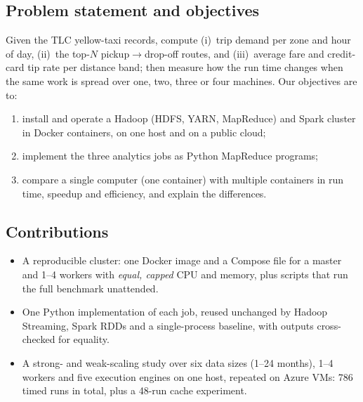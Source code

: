 \subsection{Problem statement and objectives}
Given the TLC yellow-taxi records, compute (i)~trip demand per zone and hour of day,
(ii)~the top-$N$ pickup$\rightarrow$drop-off routes, and (iii)~average fare and
credit-card tip rate per distance band; then measure how the run time changes when the
same work is spread over one, two, three or four machines. Our objectives are to:
\begin{enumerate}
  \item install and operate a Hadoop (HDFS, YARN, MapReduce) and Spark cluster in
        Docker containers, on one host and on a public cloud;
  \item implement the three analytics jobs as Python MapReduce programs;
  \item compare a single computer (one container) with multiple containers in
        run time, speedup and efficiency, and explain the differences.
\end{enumerate}

\subsection{Contributions}
\begin{itemize}
  \item A reproducible cluster: one Docker image and a Compose file for a master and
        1--4 workers with \emph{equal, capped} CPU and memory, plus scripts that run
        the full benchmark unattended.
  \item One Python implementation of each job, reused unchanged by Hadoop Streaming,
        Spark RDDs and a single-process baseline, with outputs cross-checked for
        equality.
  \item A strong- and weak-scaling study over six data sizes (1--24 months), 1--4
        workers and five execution engines on one host, repeated on Azure VMs:
        786 timed runs in total, plus a 48-run cache experiment.
\end{itemize}

